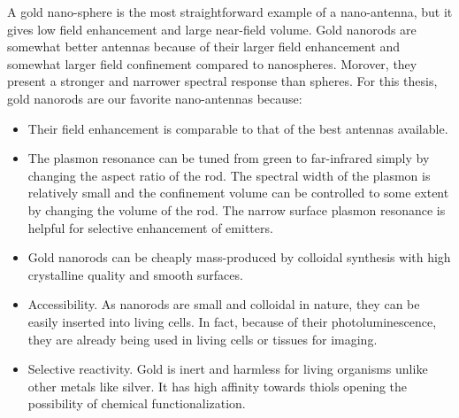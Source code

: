 A gold nano-sphere is the most straightforward example of a nano-antenna, but it gives low field enhancement and large near-field volume.\cite{punj2013gold}
Gold nanorods are somewhat better antennas because of their larger field enhancement and somewhat larger field confinement compared to nanospheres. Morover, they present a stronger and narrower spectral response than spheres. For this thesis, gold nanorods are our favorite nano-antennas because:
\begin{itemize}
	\item Their field enhancement is comparable to that of the best antennas available.
	\item The plasmon resonance can be tuned from green to far-infrared simply by changing the aspect ratio of the rod.\cite{link1999simulation}
	The spectral width of the plasmon is relatively small and the confinement volume can be controlled to some extent by changing the volume of the rod.
	The narrow surface plasmon resonance is helpful for selective enhancement of emitters.\cite{yuan2013thousandfold,khatua2014resonant}
	\item Gold nanorods can be cheaply mass-produced by colloidal synthesis with high crystalline quality and smooth surfaces.\cite{nikoobakht2003preparation,perezjuste2005gold}
	\item Accessibility. As nanorods are small and colloidal in nature, they can be easily inserted into living cells.
	In fact, because of their photoluminescence, they are already being used in living cells or tissues for imaging.
	\item Selective reactivity. Gold is inert and harmless for living organisms unlike other metals like silver.
	It has high affinity towards thiols opening the possibility of chemical functionalization.
\end{itemize}
%
